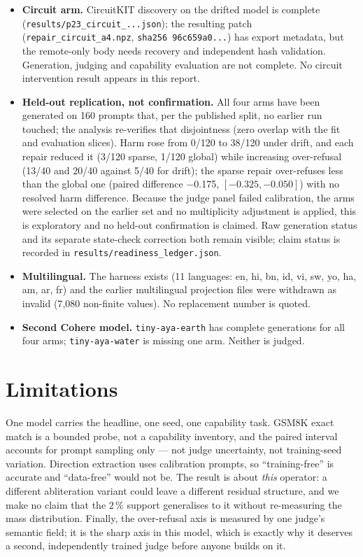 \documentclass[10pt,a4paper]{article}
\newcommand{\code}[1]{\texttt{\small #1}}
\begin{document}
\begin{itemize}
\item \textbf{Circuit arm.} CircuitKIT discovery on the drifted model is complete
(\code{results/p23\_circuit\_...json}); the resulting patch
(\code{repair\_circuit\_a4.npz}, \code{sha256 96c659a0...}) has export metadata, but the remote-only
body needs recovery and independent hash validation. Generation, judging and capability evaluation
are not complete. No circuit intervention result appears in this report.
\item \textbf{Held-out replication, not confirmation.} All four arms have been generated on 160 prompts that, per the published split, no earlier run touched; the analysis re-verifies that disjointness (zero overlap with the fit and evaluation slices). Harm rose from 0/120 to 38/120 under drift, and each repair reduced it (3/120 sparse, 1/120 global) while increasing over-refusal (13/40 and 20/40 against 5/40 for drift); the sparse repair over-refuses less than the global one (paired difference $-$0.175, $[-0.325,-0.050]$) with no resolved harm difference. Because the judge panel failed calibration, the arms were selected on the earlier set and no multiplicity adjustment is applied, this is exploratory and no held-out confirmation is claimed. Raw generation status and its separate state-check correction both remain visible; claim status is recorded in \code{results/readiness\_ledger.json}.
\item \textbf{Multilingual.} The harness exists (11 languages: en, hi, bn, id, vi, sw, yo, ha, am,
ar, fr) and the earlier multilingual projection files were withdrawn as invalid (7{,}080 non-finite
values). No replacement number is quoted.
\item \textbf{Second Cohere model.} \code{tiny-aya-earth} has complete generations for all four arms;
\code{tiny-aya-water} is missing one arm. Neither is judged.
\end{itemize}

\section{Limitations}

One model carries the headline, one seed, one capability task. GSM8K exact match is a bounded probe,
not a capability inventory, and the paired interval accounts for prompt sampling only --- not judge
uncertainty, not training-seed variation. Direction extraction uses calibration prompts, so
``training-free'' is accurate and ``data-free'' would not be. The result is about \emph{this}
operator: a different abliteration variant could leave a different residual structure, and we make no
claim that the $2\,\%$ support generalises to it without re-measuring the mass distribution. Finally,
the over-refusal axis is measured by one judge's semantic field; it is the sharp axis in this model,
which is exactly why it deserves a second, independently trained judge before anyone builds on it.
\end{document}
